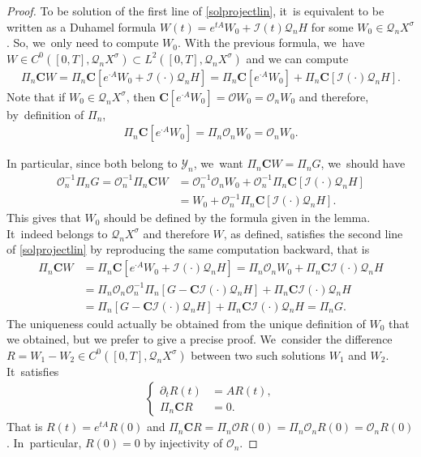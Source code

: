 \documentclass[10pt]{amsart}
\theoremstyle{definition}
\let\mc\mathcal
\renewcommand{\O}{\mc{O}}
\newcommand{\Q}{\mathcal{Q}}
\newcommand{\bC}{\boldsymbol{C}}
\begin{document}
\begin{proof}
To be solution of the first line of \eqref{solprojectlin}, it~is equivalent to be written as a Duhamel formula $W(t)=e^{tA}W_{0}+\mc{I}(t)\Q_nH$ for some $W_{0}\in \Q_{n}X^{\sigma}$. So, we~only need to compute $W_{0}$. With the previous formula, we~have $W\in C^{0}([0,T],\Q_{n}X^{\sigma})\subset L^{2}([0,T],\Q_{n}X^{\sigma})$ and we can compute
\begin{align*}
\Pi_n\bC W= \Pi_n\bC \left[e^{\cdot A}W_{0}+\mc{I}(\cdot)\Q_nH \right]=\Pi_n\bC \left[e^{\cdot A}W_{0} \right]+\Pi_n\bC \left[\mc{I}(\cdot)\Q_nH \right].
\end{align*}
Note that if $W_{0}\in \Q_{n}X^{\sigma}$, then $\bC\left[e^{\cdot A}W_{0}\right]=\O W_{0}=\O_{n} W_{0}$ and therefore, by~definition of $\Pi_{n}$,
\begin{align*}
\Pi_{n}\bC\left[e^{\cdot A}W_{0}\right]=\Pi_{n}\O_{n} W_{0}=\O_{n} W_{0}.
\end{align*}

In particular, since both belong to $\mathcal{Y}_n$, we~want $ \Pi_n\bC W=\Pi_{n}G$, we~should have
\begin{align*}
\O_n^{-1}\Pi_{n}G= \O_n^{-1} \Pi_n\bC W &=\O_n^{-1}\O_{n} W_{0}+\O_n^{-1}\Pi_n\bC \left[\mc{I}(\cdot)\Q_nH \right]\\ &=W_{0}+\O_n^{-1}\Pi_n\bC[\mc{I}(\cdot)\Q_nH].
\end{align*}
This gives that $W_{0}$ should be defined by the formula given in the lemma. It~indeed belongs to $\Q_{n}X^{\sigma}$ and therefore $W$, as defined, satisfies the second line of \eqref{solprojectlin} by reproducing the same computation backward, that is\vspace*{-3pt}
\begin{align*}
\Pi_n\bC W&=\Pi_n\bC\left[e^{\cdot A}W_{0}+\mc{I}(\cdot)\Q_nH\right] =\Pi_{n} \O_{n}W_{0}+\Pi_n\bC\mc{I}(\cdot)\Q_nH\\
&=\Pi_{n} \O_{n}\O_n^{-1}\Pi_n\left[G-\bC\mc{I}(\cdot)\Q_n H\right]+\Pi_n\bC\mc{I}(\cdot)\Q_nH\\
&=\Pi_n\left[G-\bC\mc{I}(\cdot)\Q_n H\right]+\Pi_n\bC\mc{I}(\cdot)\Q_nH=\Pi_{n}G.
\end{align*}
The uniqueness could actually be obtained from the unique definition of $W_{0}$ that we obtained, but we prefer to give a precise proof. We~consider the difference $R=W_{1}-W_{2}\in C^{0}([0,T],\Q_{n}X^{\sigma})$ between two such solutions $W_{1}$ and $W_{2}$. It~satisfies\vspace*{-3pt}
\begin{align*}
\left\{\begin{array}{rl}
\partial_t R(t)&=AR(t), \\[3pt]
\Pi_n\bC R &=0.
\end{array}\right.
\end{align*}
That is $R(t)=e^{tA}R(0)$ and $\Pi_n\bC R=\Pi_{n}\O R(0)=\Pi_{n}\O_{n}R(0)=\O_{n}R(0)$. In~particular, $R(0)=0$ by injectivity of $\O_{n}$.


\end{proof}
\end{document}
